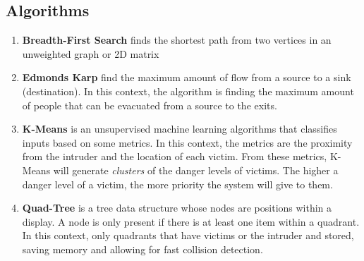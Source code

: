 \documentclass[12pt]{article}
\begin{document}
\subsection*{Algorithms}
\begin{enumerate}
\item \textbf{Breadth-First Search} finds the shortest path from two vertices in an unweighted graph or 2D matrix
\item \textbf{Edmonds Karp} find the maximum amount of flow from a source to a sink (destination). In this context, the algorithm is finding the maximum amount of people that can be evacuated from a source to the exits.
\item \textbf{K-Means} is an unsupervised machine learning algorithms that classifies inputs based on some metrics. In this context, the metrics are the proximity from the intruder and the location of each victim. From these metrics, K-Means will generate \textit{clusters} of the danger levels of victims. The higher a danger level of a victim, the more priority the system will give to them.
\item \textbf{Quad-Tree} is a tree data structure whose nodes are positions within a display. A node is only present if there is at least one item within a quadrant. In this context, only quadrants that have victims or the intruder and stored, saving memory and allowing for fast collision detection.
\end{enumerate}
\end{document}
